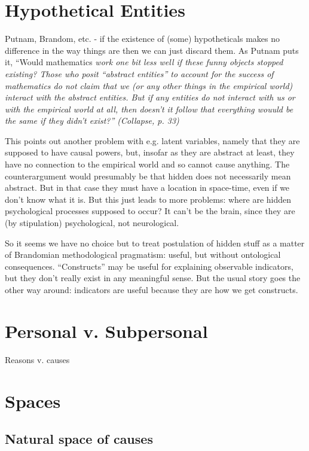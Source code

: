 \documentclass[11pt,twoside]{article}
\begin{document}
\section{Hypothetical Entities}

Putnam, Brandom, etc. - if the existence of (some) hypotheticals makes
no difference in the way things are then we can just discard them.  As
Putnam puts it, ``Would mathematics \it{work} one bit less well if
these funny objects \it{stopped} existing?  Those who posit ``abstract
entities''  to account for the success of mathematics do not claim that we (or any other things in the empirical world) \it{interact} with the abstract entities.  But if any entities do not interact with us or with the empirical world \it{at all}, then doesn't it follow that \it{everything wouuld be the same if they didn't exist}?'' (Collapse, p. 33)

This points out another problem with e.g. latent variables, namely
that they are supposed to have causal powers, but, insofar as they are
abstract at least, they have no connection to the empirical world and
so cannot cause anything.  The counterargument would presumably be
that hidden does not necessarily mean abstract.  But in that case they
must have a location in space-time, even if we don't know what it is.
But this just leads to more problems: where are hidden psychological
processes supposed to occur?  It can't be the brain, since they are
(by stipulation) psychological, not neurological.

So it seems we have no choice but to treat postulation of hidden stuff
as a matter of Brandomian methodological pragmatism: useful, but
without ontological consequences.  ``Constructs'' may be useful for
explaining observable indicators, but they don't really exist in any
meaningful sense.  But the usual story goes the other way around:
indicators are useful because they are how we get constructs.

\section{Personal v. Subpersonal}

Reasons v. causes

\section{Spaces}

\subsection{Natural space of causes}
\end{document}

